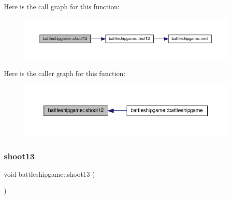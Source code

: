 Here is the call graph for this function\+:
\nopagebreak
\begin{figure}[H]
\begin{center}
\leavevmode
\includegraphics[width=350pt]{classbattleshipgame_a297eea8922b7e2b678d31396da8ba96e_cgraph}
\end{center}
\end{figure}
Here is the caller graph for this function\+:
\nopagebreak
\begin{figure}[H]
\begin{center}
\leavevmode
\includegraphics[width=350pt]{classbattleshipgame_a297eea8922b7e2b678d31396da8ba96e_icgraph}
\end{center}
\end{figure}
\mbox{\label{classbattleshipgame_a51fcb1716e0ad6cebc777c14a76c9f50}} 
\subsubsection{\texorpdfstring{shoot13}{shoot13}}
{\footnotesize\ttfamily void battleshipgame\+::shoot13 (\begin{DoxyParamCaption}{ }\end{DoxyParamCaption})\hspace{0.3cm}{\ttfamily [slot]}}


